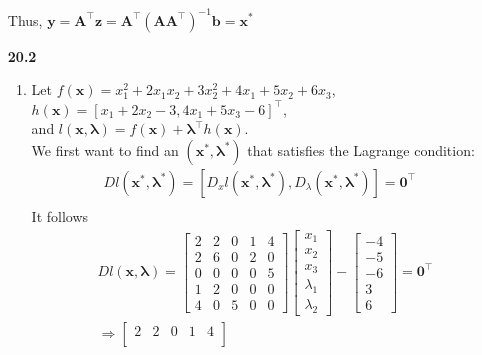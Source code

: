 \documentclass[10pt]{article}
\begin{document}
\begin{enumerate}
    Thus, $\mathbf{y}=\mathbf{A}^\top\mathbf{z}=\mathbf{A}^\top{(\mathbf{A}\mathbf{A}^\top)}^{-1}\mathbf{b}=\mathbf{x}^*$
    \item [\textbf{20.2}]\begin{enumerate}
        \item Let $f(\mathbf{x})=x^2_1+2x_1x_2+3x_2^2+4x_1+5x_2+6x_3$,\\ 
        $h(\mathbf{x})={[x_1+2x_2-3,4x_1+5x_3-6]}^\top$,\\
        and $l(\mathbf{x},\mathbf{\lambda})=f(\mathbf{x})+\mathbf{\lambda}^\top h(\mathbf{x})$.\\
        We first want to find an $(\mathbf{x}^*,\mathbf{\lambda}^*)$ that satisfies the Lagrange condition:
        \begin{align*}
            Dl(\mathbf{x}^*,\mathbf{\lambda}^*)=[D_xl(\mathbf{x}^*,\mathbf{\lambda}^*),D_\lambda(\mathbf{x}^*,\mathbf{\lambda}^*)]=\mathbf{0}^\top\\
        \end{align*}
        It follows
        \begin{align*}
            &Dl(\mathbf{x},\mathbf{\lambda})=\begin{bmatrix}
                2 & 2 & 0 & 1 & 4\\
                2 & 6 & 0 & 2 & 0\\
                0 & 0 & 0 & 0 & 5\\
                1 & 2 & 0 & 0 & 0\\
                4 & 0 & 5 & 0 & 0
            \end{bmatrix}\begin{bmatrix}
                x_1\\
                x_2\\
                x_3\\
                \lambda_1\\
                \lambda_2
            \end{bmatrix}-\begin{bmatrix}
                -4\\
                -5\\
                -6\\
                3\\
                6
            \end{bmatrix}=\mathbf{0}^\top\\
            &\Rightarrow \begin{bmatrix}
                2 & 2 & 0 & 1 & 4\\

\end{bmatrix}
\end{align*}
\end{enumerate}
\end{enumerate}
\end{document}
